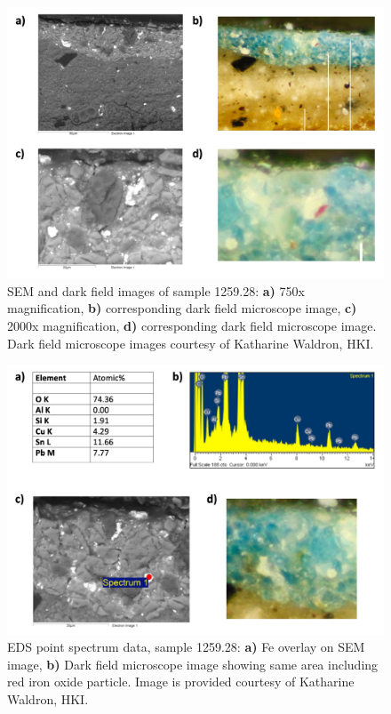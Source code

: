 \begin{figure}[H]
  \centering
  \includegraphics[width=\linewidth]{1259-28_imgs}
\caption[SEM and dark field images of sample 1259.28.]{SEM and dark field images of sample 1259.28: \textbf{a)} 750x magnification, \textbf{b)} corresponding dark field microscope image, \textbf{c)} 2000x magnification, \textbf{d)} corresponding dark field microscope image. Dark field microscope images courtesy of Katharine Waldron, HKI.}
\label{fig:1259.28_imgs}
\end{figure}

\begin{figure}[H]
  \centering
  \includegraphics[width=\linewidth]{1259-28_pointspec}
\caption[EDS map data, sample 1259.28.]{EDS point spectrum data, sample 1259.28: \textbf{a)} Fe overlay on SEM image, \textbf{b)} Dark field microscope image showing same area including red iron oxide particle. Image is provided courtesy of Katharine Waldron, HKI.}
\label{fig:1259.28_map_iron}
\end{figure}


